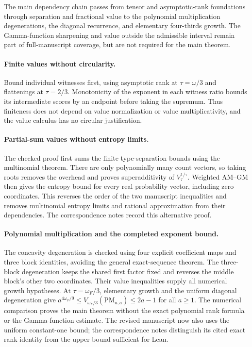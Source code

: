 The main dependency chain passes from tensor and asymptotic-rank foundations
through separation and fractional value to the polynomial multiplication
degenerations, the diagonal recurrence, and elementary four-thirds growth.
The Gamma-function sharpening and value outside the admissible interval remain
part of full-manuscript coverage, but are not required for the main theorem.

\paragraph{Finite values without circularity.}
Bound individual witnesses first, using asymptotic rank at $\tau=\omega/3$ and
flattenings at $\tau=2/3$. Monotonicity of the exponent in each witness ratio
bounds its intermediate scores by an endpoint before taking the supremum.
Thus finiteness does not depend on value normalization or value
multiplicativity, and the value calculus has no circular justification.

\paragraph{Partial-sum values without entropy limits.}
The checked proof first sums the finite type-separation bounds using the
multinomial theorem. There are only polynomially many count vectors, so taking
roots removes the overhead and proves superadditivity of $V_\tau^{1/\tau}$.
Weighted AM--GM then gives the entropy bound for every real probability vector,
including zero coordinates. This reverses the order of the two manuscript
inequalities and removes multinomial entropy limits and rational approximation
from their dependencies. The correspondence notes record this alternative proof.

\paragraph{Polynomial multiplication and the completed exponent bound.}
The concavity degeneration is checked using four explicit coefficient maps
and three block identities, avoiding the general exact-sequence theorem.
The three-block degeneration keeps the shared first factor fixed and reverses
the middle block's other two coordinates. Their value inequalities supply
all numerical growth hypotheses. At $\tau=\omega_F/3$, elementary growth and
the uniform diagonal degeneration give
$a^{4\omega_F/9}\le V_{\omega_F/3}(\mathrm{PM}_{a,a})\le2a-1$ for all $a\ge1$.
The numerical comparison proves the main theorem without the exact polynomial
rank formula or the Gamma-function estimate. The revised manuscript now also
uses the uniform constant-one bound; the correspondence notes distinguish
its cited exact rank identity from the upper bound sufficient for Lean.

